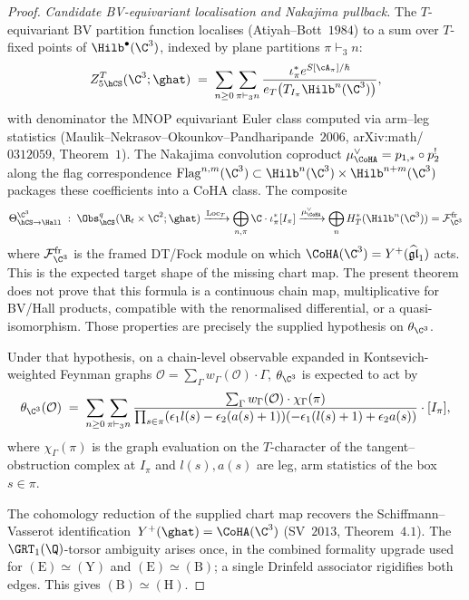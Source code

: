 \begin{proof}
\emph{Candidate BV-equivariant localisation and Nakajima pullback.} The
$T$-equivariant BV partition function localises
\textup{(}Atiyah--Bott~$1984$\textup{)} to a sum over $T$-fixed points
of $\Hilb^\bullet(\C^3)$, indexed by plane partitions
$\pi\vdash_3 n$:
\[
Z^T_{5\hCS}(\C^3;\ghat)
\;=\;
\sum_{n\geq 0}\sum_{\pi\vdash_3 n}
\frac{\iota_\pi^* e^{S[\cA_\pi]/\hbar}}
{e_T\bigl(T_{I_\pi}\Hilb^n(\C^3)\bigr)},
\]
with denominator the MNOP equivariant Euler class computed via
arm--leg statistics
\textup{(}Maulik--Nekrasov--Okounkov--Pandharipande~$2006$,
arXiv:math/$0312059$, Theorem~$1$\textup{)}. The Nakajima
convolution coproduct
$\mu_{\CoHA}^\vee=p_{1,*}\circ p_2^!$ along the flag correspondence
$\operatorname{Flag}^{n,m}(\C^3)\subset\Hilb^n(\C^3)\times\Hilb^{n+m}(\C^3)$ packages
these coefficients into a CoHA class. The composite
\[
\Theta_{\hCS\to\Hall}^{\C^3}
\;:\;
\Obs_{\hCS}^{q}(\R_t\times\C^2;\ghat)
\xrightarrow{\mathrm{Loc}_T}
\bigoplus_{n,\pi}\C\cdot\iota_\pi^*[I_\pi]
\xrightarrow{\mu_{\CoHA}^\vee}
\bigoplus_n H^*_T(\Hilb^n(\C^3))
=\mathcal F_{\C^3}^{\mathrm{fr}}
\]
where \(\mathcal F_{\C^3}^{\mathrm{fr}}\) is the framed DT/Fock module
on which \(\CoHA(\C^3)=Y^+(\widehat{\mathfrak{gl}}_1)\) acts.  This is
the expected target shape of the missing chart map. The present
theorem does not prove that this formula is a continuous chain map,
multiplicative for BV/Hall products, compatible with the renormalised
differential, or a quasi-isomorphism. Those properties are precisely
the supplied hypothesis on $\theta_{\C^3}$.

Under that hypothesis, on a chain-level observable expanded in
Kontsevich-weighted Feynman
graphs $\mathcal O=\sum_\Gamma w_\Gamma(\mathcal O)\cdot\Gamma$,
$\theta_{\C^3}$ is expected to act by
\[
\theta_{\C^3}(\mathcal O)
\;=\;
\sum_{n\geq 0}\sum_{\pi\vdash_3 n}
\frac{\sum_\Gamma w_\Gamma(\mathcal O)\cdot\chi_\Gamma(\pi)}
{\prod_{s\in\pi}(\epsilon_1 l(s)-\epsilon_2(a(s)+1))
(-\epsilon_1(l(s)+1)+\epsilon_2 a(s))}
\cdot [I_\pi],
\]
where $\chi_\Gamma(\pi)$ is the graph evaluation on the $T$-character
of the tangent--obstruction complex at $I_\pi$ and
$l(s),a(s)$ are leg, arm statistics of the box $s\in\pi$.

The cohomology reduction of the supplied chart map recovers the
Schiffmann--Vasserot identification~$Y^+(\ghat)=\CoHA(\C^3)$
\textup{(}SV~$2013$, Theorem~$4.1$\textup{)}. The $\GRT_1(\Q)$-torsor
ambiguity arises once, in
the combined formality upgrade used for $(\mathrm E)\simeq(\mathrm Y)$
and $(\mathrm E)\simeq(\mathrm B)$; a single Drinfeld associator
rigidifies both edges. This gives $(\mathrm B)\simeq(\mathrm H)$.


\end{proof}
